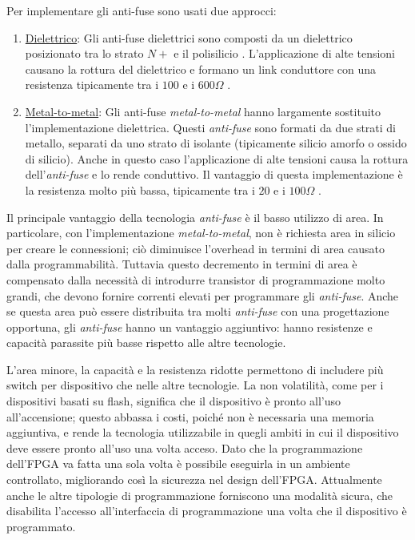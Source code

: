 Per implementare gli anti-fuse sono usati due approcci:
\begin{enumerate}
	\item \underline{Dielettrico}: Gli anti-fuse dielettrici sono composti da un dielettrico posizionato tra lo strato $N+$ e il polisilicio \cite{32929}. L'applicazione di alte tensioni causano la rottura del dielettrico e formano un link conduttore con una resistenza tipicamente tra i $100$ e i $600\Omega$ \cite{231343}.
	\item \underline{Metal-to-metal}: Gli anti-fuse \textit{metal-to-metal} hanno largamente sostituito l'implementazione dielettrica. Questi \textit{anti-fuse} sono formati da due strati di metallo, separati da uno strato di isolante (tipicamente silicio amorfo o ossido di silicio). Anche in questo caso l'applicazione di alte tensioni causa la rottura dell'\textit{anti-fuse} e lo rende conduttivo. Il vantaggio di questa implementazione è la resistenza molto più bassa, tipicamente tra i $20$ e i $100 \Omega$ \cite{584227}.
\end{enumerate}

Il principale vantaggio della tecnologia \textit{anti-fuse} è il basso utilizzo di area. In particolare, con l'implementazione \textit{metal-to-metal}, non è richiesta area in silicio per creare le connessioni; ciò diminuisce l'overhead in termini di area causato dalla programmabilità. Tuttavia questo decremento in termini di area è compensato dalla necessità di introdurre transistor di programmazione molto grandi, che devono fornire correnti elevati per programmare gli \textit{anti-fuse}. Anche se questa area può essere distribuita tra molti \textit{anti-fuse} con una progettazione opportuna, gli \textit{anti-fuse} hanno un vantaggio aggiuntivo: hanno resistenze e capacità parassite più basse rispetto alle altre tecnologie.

L'area minore, la capacità e la resistenza ridotte permettono di includere più switch per dispositivo che nelle altre tecnologie. La non volatilità, come per i dispositivi basati su flash, significa che il dispositivo è pronto all'uso all'accensione; questo abbassa i costi, poiché non è necessaria una memoria aggiuntiva, e rende la tecnologia utilizzabile in quegli ambiti in cui il dispositivo deve essere pronto all'uso una volta acceso. Dato che la programmazione dell'FPGA va fatta una sola volta è possibile eseguirla in un ambiente controllato, migliorando così la sicurezza nel design dell'FPGA. Attualmente anche le altre tipologie di programmazione forniscono una modalità sicura, che disabilita l'accesso all'interfaccia di programmazione una volta che il dispositivo è programmato.

